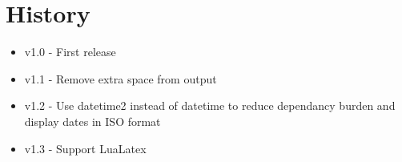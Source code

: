 \documentclass[a4paper]{ltxdoc}
\begin{document}

\section{History}

\begin{itemize}
	\item v1.0 - First release
	\item v1.1 - Remove extra space from output
	\item v1.2 - Use datetime2 instead of datetime to reduce dependancy burden
   				 and display dates in ISO format
   	\item v1.3 - Support LuaLatex
\end{itemize}
\end{document}
